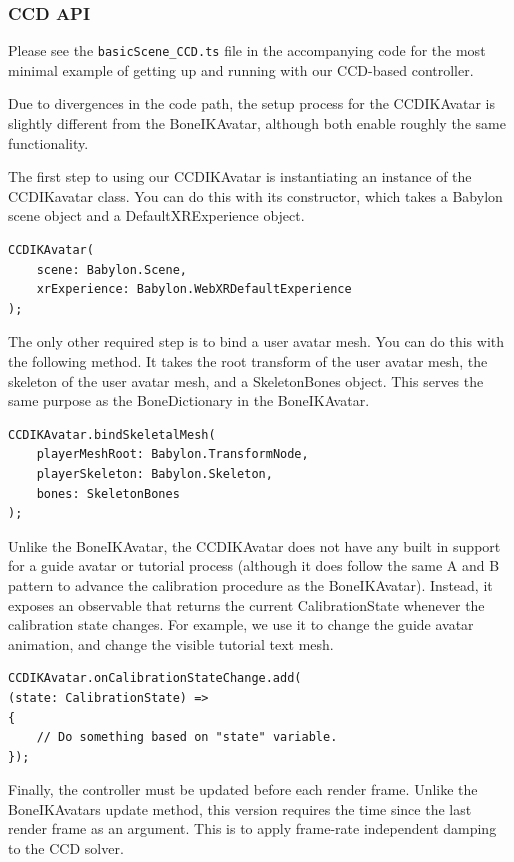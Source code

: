 \documentclass{vgtc}                          %
\begin{document}
\subsubsection{CCD API}

Please see the \verb|basicScene_CCD.ts| file in the accompanying code \cite{ourcode} for the most minimal example of getting up and running with our CCD-based controller.

Due to divergences in the code path, the setup process for the CCDIKAvatar is slightly different from the BoneIKAvatar, although both enable roughly the same functionality.

The first step to using our CCDIKAvatar is instantiating an instance of the CCDIKavatar class. You can do this with its constructor, which takes a Babylon scene object and a DefaultXRExperience object.

\begin{verbatim}
CCDIKAvatar(
    scene: Babylon.Scene,
    xrExperience: Babylon.WebXRDefaultExperience
);
\end{verbatim}

The only other required step is to bind a user avatar mesh. You can do this with the following method. It takes the root transform of the user avatar mesh, the skeleton of the user avatar mesh, and a SkeletonBones object. This serves the same purpose as the BoneDictionary in the BoneIKAvatar.

\begin{verbatim}
CCDIKAvatar.bindSkeletalMesh(
    playerMeshRoot: Babylon.TransformNode,
    playerSkeleton: Babylon.Skeleton,
    bones: SkeletonBones
);
\end{verbatim}

Unlike the BoneIKAvatar, the CCDIKAvatar does not have any built in support for a guide avatar or tutorial process (although it does follow the same A and B pattern to advance the calibration procedure as the BoneIKAvatar). Instead, it exposes an observable that returns the current CalibrationState whenever the calibration state changes. For example, we use it to change the guide avatar animation, and change the visible tutorial text mesh.

\begin{verbatim}
CCDIKAvatar.onCalibrationStateChange.add(
(state: CalibrationState) =>
{
    // Do something based on "state" variable.
});
\end{verbatim}

Finally, the controller must be updated before each render frame. Unlike the BoneIKAvatars update method, this version requires the time since the last render frame as an argument. This is to apply frame-rate independent damping to the CCD solver.
\end{document}
